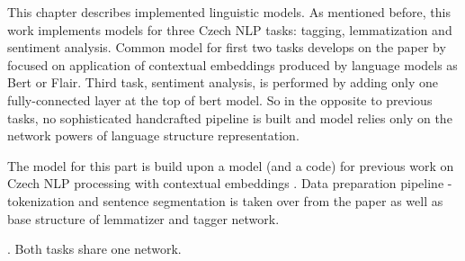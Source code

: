 
This chapter describes implemented linguistic models. As mentioned before, this work implements models for three Czech NLP tasks: tagging, lemmatization and sentiment analysis. Common model for first two tasks develops on the paper by \cite[]{straka2019czech} focused on application of contextual embeddings produced by language models as Bert %
 or Flair. %
 Third task, sentiment analysis, is performed by adding only one fully-connected layer at the top of bert model. So in the opposite to previous tasks, no sophisticated handcrafted pipeline is built and model relies only on the network powers of language structure representation.

The model for this part is build upon a model (and a code) for previous work on Czech NLP processing with contextual embeddings \citep{straka2019czech}. Data preparation %
pipeline - tokenization and sentence segmentation is taken over from the paper as well as base structure of lemmatizer and tagger network. 

. Both tasks share one network.



